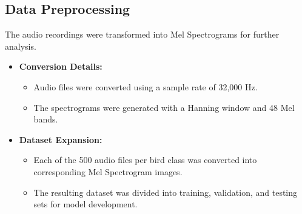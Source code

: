 





\subsection{Data Preprocessing}
The audio recordings were transformed into Mel Spectrograms for further analysis.  

\begin{itemize}
    \item \textbf{Conversion Details:}  
    \begin{itemize}
        \item Audio files were converted using a sample rate of 32,000 Hz.  
        \item The spectrograms were generated with a Hanning window and 48 Mel bands.  
    \end{itemize}

    \item \textbf{Dataset Expansion:}  
    \begin{itemize}
        \item Each of the 500 audio files per bird class was converted into corresponding Mel Spectrogram images.  
        \item The resulting dataset was divided into training, validation, and testing sets for model development.
    \end{itemize}
\end{itemize}

